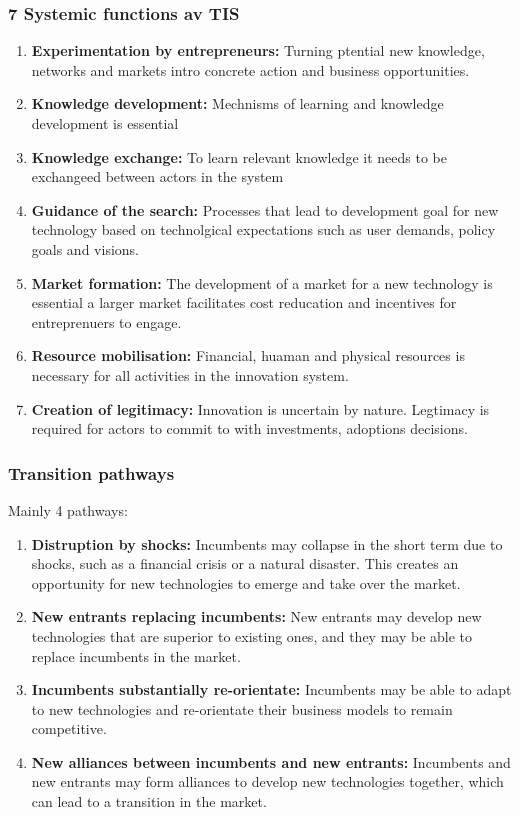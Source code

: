 \documentclass[12pt,a4paper]{article}
\begin{document}
\subsubsection{7 Systemic functions av TIS}
\begin{enumerate}
    \item \textbf{Experimentation by entrepreneurs:} Turning ptential new knowledge, networks and markets intro concrete action and business opportunities.
    \item \textbf{Knowledge development:} Mechnisms of learning and knowledge development is essential
    \item \textbf{Knowledge exchange:} To learn relevant knowledge it needs to be exchangeed between actors in the system
    \item \textbf{Guidance of the search:} Processes that lead to development goal for new technology based on technolgical expectations such as user demands, policy goals and visions.
    \item \textbf{Market formation:} The development of a market for a new technology is essential a larger market facilitates cost reducation and incentives for entreprenuers to engage.
    \item \textbf{Resource mobilisation:} Financial, huaman and physical resources is necessary for all activities in the innovation system.
    \item \textbf{Creation of legitimacy:} Innovation is uncertain by nature. Legtimacy is required for actors to commit to with investments, adoptions decisions.
\end{enumerate}

\subsubsection{Transition pathways}
Mainly 4 pathways:
\begin{enumerate}
    \item \textbf{Distruption by shocks:} Incumbents may collapse in the short term due to shocks, such as a financial crisis or a natural disaster. This creates an opportunity for new technologies to emerge and take over the market.
    \item \textbf{New entrants replacing incumbents:} New entrants may develop new technologies that are superior to existing ones, and they may be able to replace incumbents in the market.
    \item \textbf{Incumbents substantially re-orientate:} Incumbents may be able to adapt to new technologies and re-orientate their business models to remain competitive.
    \item \textbf{New alliances between incumbents and new entrants:} Incumbents and new entrants may form alliances to develop new technologies together, which can lead to a transition in the market.
\end{enumerate}
\end{document}
